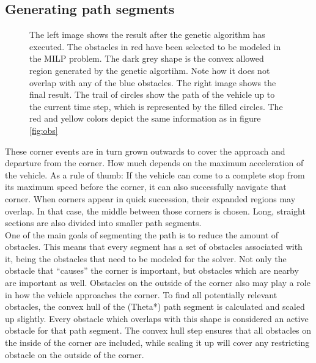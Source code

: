 \subsection{Generating path segments}
\begin{figure}[!t]
    \centering
    \hfil
    \caption{The left image shows the result after the genetic algorithm has executed. The obstacles in red have been selected to be modeled in the MILP problem. The dark grey shape is the convex allowed region generated by the genetic algortihm. Note how it does not overlap with any of the blue obstacles. The right image shows the final result. The trail of circles show the path of the vehicle up to the current time step, which is represented by the filled circles. The red and yellow colors depict the same information as in figure \ref{fig:obs}}\label{fig:pre-3-4}
\end{figure}
These corner events are in turn grown outwards to cover the approach and departure from the corner. How much depends on the maximum acceleration of the vehicle. As a rule of thumb: If the vehicle can come to a complete stop from its maximum speed before the corner, it can also successfully navigate that corner. When corners appear in quick succession, their expanded regions may overlap. In that case, the middle between those corners is chosen. Long, straight sections are also divided into smaller path segments.\\
One of the main goals of segmenting the path is to reduce the amount of obstacles. This means that every segment has a set of obstacles associated with it, being the obstacles that need to be modeled for the solver. Not only the obstacle that ``causes'' the corner is important, but obstacles which are nearby are important as well. Obstacles on the outside of the corner also may play a role in how the vehicle approaches the corner. To find all potentially relevant obstacles, the convex hull of the (Theta*) path segment is calculated and scaled up slightly. Every obstacle which overlaps with this shape is considered an active obstacle for that path segment. The convex hull step ensures that all obstacles on the inside of the corner are included, while scaling it up will cover any restricting obstacle on the outside of the corner.
